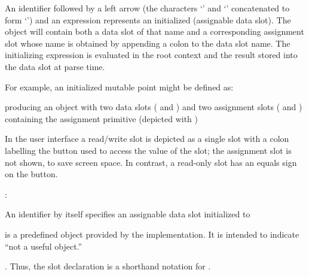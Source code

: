 \documentclass[letterpaper,10pt,english]{sphinxmanual}
\begin{document}
An identifier followed by a left arrow (the characters ‘\sphinxcode{\textless{}}’ and ‘\sphinxcode{-}’ concatenated to form ‘\sphinxcode{\textless{}-}’) and an expression represents an initialized  (assignable data slot). The object will contain both a data slot of that name and a corresponding assignment slot whose name is obtained by appending a colon to the data slot name. The initializing expression is evaluated in the root context and the result stored into the data slot at parse time.

For example, an initialized mutable point might be defined as:

\begin{sphinxVerbatim}[commandchars=\\\{\}]
       
          
        
 
\end{sphinxVerbatim}

producing an object with two data slots ( and ) and two assignment slots ( and ) containing the assignment primitive (depicted with ) %
\begin{footnote}[4]\sphinxAtStartFootnote
In the user interface a read/write slot is depicted as a single slot with a colon labelling the button used to access the value of the slot; the assignment slot is not shown, to save screen space. In contrast, a read-only slot has an equals sign on the button.
%
\end{footnote}:
\begin{figure}[htbp]
\centering

\noindent{}
\end{figure}

An identifier by itself specifies an assignable data slot initialized to  %
\begin{footnote}[5]\sphinxAtStartFootnote
{} is a predefined object provided by the implementation. It is intended to indicate “not a useful object.”
%
\end{footnote}. Thus, the slot declaration  is a shorthand notation for .
\end{document}

